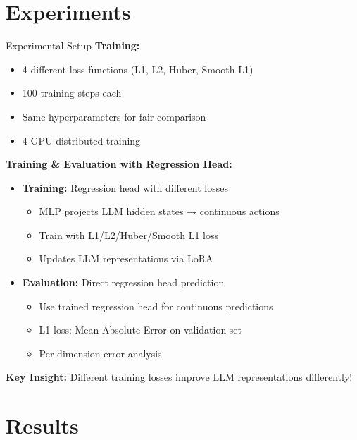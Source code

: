 \documentclass[aspectratio=169]{beamer}
\begin{document}
\section{Experiments}

\begin{frame}{Experimental Setup}
\textbf{Training:}
\begin{itemize}
    \item 4 different loss functions (L1, L2, Huber, Smooth L1)
    \item 100 training steps each
    \item Same hyperparameters for fair comparison
    \item 4-GPU distributed training
\end{itemize}

\vspace{0.3cm}
\textbf{Training \& Evaluation with Regression Head:}
\begin{itemize}
    \item \textbf{Training:} Regression head with different losses
    \begin{itemize}
        \item MLP projects LLM hidden states → continuous actions
        \item Train with L1/L2/Huber/Smooth L1 loss
        \item Updates LLM representations via LoRA
    \end{itemize}
    \item \textbf{Evaluation:} Direct regression head prediction
    \begin{itemize}
        \item Use trained regression head for continuous predictions
        \item L1 loss: Mean Absolute Error on validation set
        \item Per-dimension error analysis
    \end{itemize}
\end{itemize}

\textbf{Key Insight:} Different training losses improve LLM representations differently!
\end{frame}

\section{Results}
\end{document}
